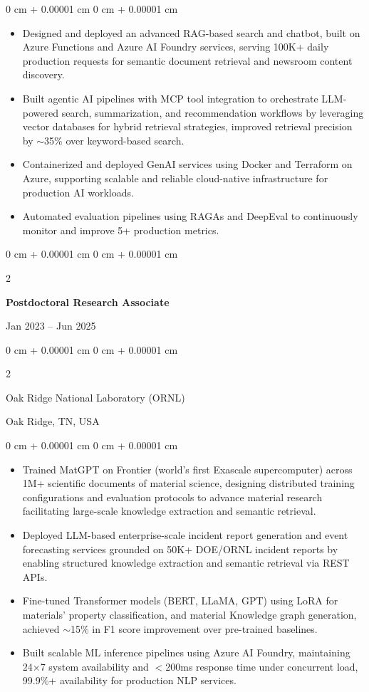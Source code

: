 \documentclass[10pt, letterpaper]{article}
\newenvironment{highlights}{
    \begin{itemize}[
        topsep=0.10 cm,
        parsep=0.10 cm,
        partopsep=0pt,
        itemsep=0pt,
        leftmargin=0 cm + 10pt
    ]
}{
    \end{itemize}
} %
\newenvironment{onecolentry}{
    \begin{adjustwidth}{
        0 cm + 0.00001 cm
    }{
        0 cm + 0.00001 cm
    }
}{
    \end{adjustwidth}
} %
\newenvironment{twocolentry}[2][]{
    \onecolentry
    \def\secondColumn{#2}
    \setcolumnwidth{\fill, 4.5 cm}
    \begin{paracol}{2}
}{
    \switchcolumn \raggedleft \secondColumn
    \end{paracol}
    \endonecolentry
} %
\begin{document}
    \begin{onecolentry}
        \begin{highlights}
            \item Designed and deployed an advanced RAG-based search and chatbot, built on Azure Functions and Azure AI Foundry services, serving 100K+ daily production requests for semantic document retrieval and newsroom content discovery.
            \item Built agentic AI pipelines with MCP tool integration to orchestrate LLM-powered search, summarization, and recommendation workflows by leveraging vector databases for hybrid retrieval strategies, improved retrieval precision by $\sim$35\% over keyword-based search.
            \item Containerized and deployed GenAI services using Docker and Terraform on Azure, supporting scalable and reliable cloud-native infrastructure for production AI workloads.
            \item Automated evaluation pipelines using RAGAs and DeepEval to continuously monitor and improve 5+ production metrics.
        \end{highlights}
    \end{onecolentry}

\vspace{1mm}

    \begin{twocolentry}{Jan 2023 -- Jun 2025}
        \textbf{Postdoctoral Research Associate}
    \end{twocolentry}
    \begin{twocolentry}{Oak Ridge, TN, USA}
        Oak Ridge National Laboratory (ORNL)
    \end{twocolentry}
    \vspace{0.10 cm}
    \begin{onecolentry}
        \begin{highlights}
            \item Trained MatGPT on Frontier (world’s first Exascale supercomputer) across 1M+ scientific documents of material science, designing distributed training configurations and evaluation protocols to advance material research facilitating large-scale knowledge extraction and semantic retrieval.
            \item Deployed LLM-based enterprise-scale incident report generation and event forecasting services grounded on 50K+ DOE/ORNL incident reports by enabling structured knowledge extraction and semantic retrieval via REST APIs.
            \item Fine-tuned Transformer models (BERT, LLaMA, GPT) using LoRA for materials' property classification, and material Knowledge graph generation, achieved $\sim$15\% in F1 score improvement over pre-trained baselines.
            \item Built scalable ML inference pipelines using Azure AI Foundry, maintaining 24×7 system availability and $<$200ms response time under concurrent load, 99.9\%+ availability for production NLP services.
        \end{highlights}
    \end{onecolentry}
\end{document}
